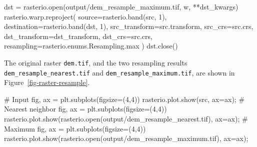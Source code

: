 \documentclass[
  letterpaper,
]{krantz}
\newenvironment{Shaded}{\begin{snugshade}}{\end{snugshade}}
\newcommand{\BuiltInTok}[1]{\textcolor[rgb]{0.00,0.23,0.31}{#1}}
\newcommand{\CommentTok}[1]{\textcolor[rgb]{0.37,0.37,0.37}{#1}}
\newcommand{\DecValTok}[1]{\textcolor[rgb]{0.68,0.00,0.00}{#1}}
\newcommand{\NormalTok}[1]{\textcolor[rgb]{0.00,0.23,0.31}{#1}}
\newcommand{\OperatorTok}[1]{\textcolor[rgb]{0.37,0.37,0.37}{#1}}
\newcommand{\StringTok}[1]{\textcolor[rgb]{0.13,0.47,0.30}{#1}}
\begin{document}
\begin{Shaded}
\begin{Highlighting}[]
\NormalTok{dst }\OperatorTok{=}\NormalTok{ rasterio.}\BuiltInTok{open}\NormalTok{(}\StringTok{\textquotesingle{}output/dem\_resample\_maximum.tif\textquotesingle{}}\NormalTok{, }\StringTok{\textquotesingle{}w\textquotesingle{}}\NormalTok{, }\OperatorTok{**}\NormalTok{dst\_kwargs)}
\NormalTok{rasterio.warp.reproject(}
\NormalTok{    source}\OperatorTok{=}\NormalTok{rasterio.band(src, }\DecValTok{1}\NormalTok{),}
\NormalTok{    destination}\OperatorTok{=}\NormalTok{rasterio.band(dst, }\DecValTok{1}\NormalTok{),}
\NormalTok{    src\_transform}\OperatorTok{=}\NormalTok{src.transform,}
\NormalTok{    src\_crs}\OperatorTok{=}\NormalTok{src.crs,}
\NormalTok{    dst\_transform}\OperatorTok{=}\NormalTok{dst\_transform,}
\NormalTok{    dst\_crs}\OperatorTok{=}\NormalTok{src.crs,}
\NormalTok{    resampling}\OperatorTok{=}\NormalTok{rasterio.enums.Resampling.}\BuiltInTok{max}
\NormalTok{)}
\NormalTok{dst.close()}
\end{Highlighting}
\end{Shaded}

The original raster \texttt{dem.tif}, and the two resampling results
\texttt{dem\_resample\_nearest.tif} and
\texttt{dem\_resample\_maximum.tif}, are shown in
Figure~\ref{fig-raster-resample}.

\begin{Shaded}
\begin{Highlighting}[]
\CommentTok{\# Input}
\NormalTok{fig, ax }\OperatorTok{=}\NormalTok{ plt.subplots(figsize}\OperatorTok{=}\NormalTok{(}\DecValTok{4}\NormalTok{,}\DecValTok{4}\NormalTok{))}
\NormalTok{rasterio.plot.show(src, ax}\OperatorTok{=}\NormalTok{ax)}\OperatorTok{;}
\CommentTok{\# Nearest neighbor}
\NormalTok{fig, ax }\OperatorTok{=}\NormalTok{ plt.subplots(figsize}\OperatorTok{=}\NormalTok{(}\DecValTok{4}\NormalTok{,}\DecValTok{4}\NormalTok{))}
\NormalTok{rasterio.plot.show(rasterio.}\BuiltInTok{open}\NormalTok{(}\StringTok{\textquotesingle{}output/dem\_resample\_nearest.tif\textquotesingle{}}\NormalTok{), ax}\OperatorTok{=}\NormalTok{ax)}\OperatorTok{;}
\CommentTok{\# Maximum}
\NormalTok{fig, ax }\OperatorTok{=}\NormalTok{ plt.subplots(figsize}\OperatorTok{=}\NormalTok{(}\DecValTok{4}\NormalTok{,}\DecValTok{4}\NormalTok{))}
\NormalTok{rasterio.plot.show(rasterio.}\BuiltInTok{open}\NormalTok{(}\StringTok{\textquotesingle{}output/dem\_resample\_maximum.tif\textquotesingle{}}\NormalTok{), ax}\OperatorTok{=}\NormalTok{ax)}\OperatorTok{;}
\end{Highlighting}
\end{Shaded}
\end{document}
